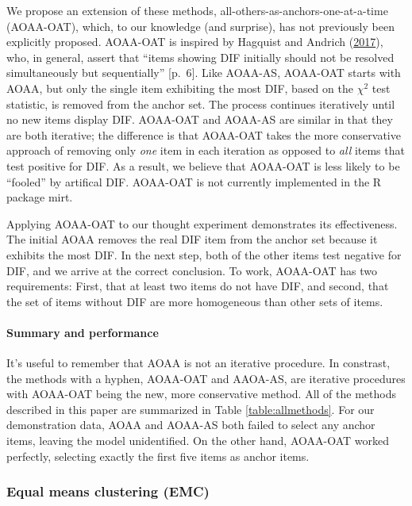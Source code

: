 \documentclass[
  11pt,
]{article}
\begin{document}
We propose an extension of these methods, all-others-as-anchors-one-at-a-time (AOAA-OAT), which, to our knowledge (and surprise), has not previously been explicitly proposed. AOAA-OAT is inspired by Hagquist and Andrich (\protect\hyperlink{ref-hagquist2017recent}{2017}), who, in general, assert that \enquote{items showing DIF initially should not be resolved simultaneously but sequentially} {[}p.~6{]}. Like AOAA-AS, AOAA-OAT starts with AOAA, but only the single item exhibiting the most DIF, based on the \(\chi^2\) test statistic, is removed from the anchor set. The process continues iteratively until no new items display DIF. AOAA-OAT and AOAA-AS are similar in that they are both iterative; the difference is that AOAA-OAT takes the more conservative approach of removing only \emph{one} item in each iteration as opposed to \emph{all} items that test positive for DIF. As a result, we believe that AOAA-OAT is less likely to be \enquote{fooled} by artifical DIF. AOAA-OAT is not currently implemented in the R package mirt.

Applying AOAA-OAT to our thought experiment demonstrates its effectiveness. The initial AOAA removes the real DIF item from the anchor set because it exhibits the most DIF. In the next step, both of the other items test negative for DIF, and we arrive at the correct conclusion. To work, AOAA-OAT has two requirements: First, that at least two items do not have DIF, and second, that the set of items without DIF are more homogeneous than other sets of items.

\hypertarget{summary-and-performance}{%
\paragraph{Summary and performance}\label{summary-and-performance}}

It's useful to remember that AOAA is not an iterative procedure. In constrast, the methods with a hyphen, AOAA-OAT and AAOA-AS, are iterative procedures with AOAA-OAT being the new, more conservative method. All of the methods described in this paper are summarized in Table \ref{table:allmethods}. For our demonstration data, AOAA and AOAA-AS both failed to select any anchor items, leaving the model unidentified. On the other hand, AOAA-OAT worked perfectly, selecting exactly the first five items as anchor items.

\hypertarget{equal-means-clustering-emc}{%
\subsubsection{Equal means clustering (EMC)}\label{equal-means-clustering-emc}}
\end{document}
